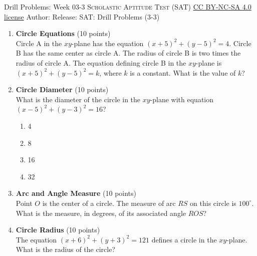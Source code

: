 \newpage\handout
{Drill Problems: Week 03-3}
{\textsc{Scholastic Aptitude Test (SAT)}}
{\href{https://creativecommons.org/licenses/by-nc-sa/4.0/}{CC BY-NC-SA 4.0 license}}
{Author: \BookAuthor}{Release: \generatedOn}
{SAT: Drill Problems (3-3)}


\begin{enumerate}
  \item \textbf{Circle Equations} (10 points)\\
  Circle A in the $xy$-plane has the equation $(x+5)^2+(y-5)^2=4$. Circle B has the same center as circle A. The radius of circle B is two times the radius of circle A. The equation defining circle B in the $xy$-plane is $(x+5)^2+(y-5)^2=k$, where $k$ is a constant. What is the value of $k$?
  \begin{subanswer}
  \end{subanswer}

  \item \textbf{Circle Diameter} (10 points)\\
  What is the diameter of the circle in the $xy$-plane with equation $(x-5)^2+(y-3)^2=16$?\\
  \begin{enumerate}[label=(\Alph*)]
    \item 4
    \item 8
    \item 16
    \item 32
  \end{enumerate}
  \begin{subanswer}
  \end{subanswer}

  \item \textbf{Arc and Angle Measure} (10 points)\\
  Point $O$ is the center of a circle. The measure of arc $RS$ on this circle is $100^{\circ}$. What is the measure, in degrees, of its associated angle $ROS$?
  \begin{subanswer}
  \end{subanswer}

  \item \textbf{Circle Radius} (10 points)\\
  The equation $(x+6)^2+(y+3)^2=121$ defines a circle in the $xy$-plane. What is the radius of the circle?
  \begin{subanswer}
  \end{subanswer}


\end{enumerate}
